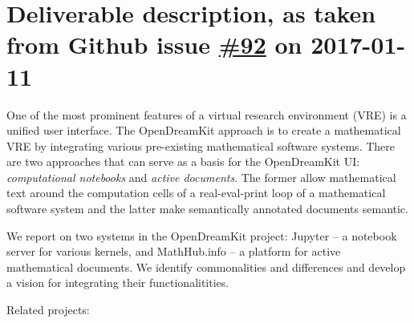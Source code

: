 \section*{\texorpdfstring{Deliverable description, as taken from Github
issue
\href{https://github.com/OpenDreamKit/OpenDreamKit/issues/91}{\#92} on
2017-01-11}{Deliverable description, as taken from Github issue \#92 on 2017-01-11}}\label{deliverable-description-as-taken-from-github-issue-92-on-2017-01-11}


One of the most prominent features of a virtual research environment
(VRE) is a unified user interface. The OpenDreamKit approach is to
create a mathematical VRE by integrating various pre-existing
mathematical software systems. There are two approaches that can serve
as a basis for the OpenDreamKit UI: \emph{computational notebooks} and
\emph{active documents}. The former allow mathematical text around the
computation cells of a real-eval-print loop of a mathematical software
system and the latter make semantically annotated documents semantic.

We report on two systems in the OpenDreamKit project: Jupyter -- a
notebook server for various kernels, and MathHub.info -- a platform for
active mathematical documents. We identify commonalities and differences
and develop a vision for integrating their functionalitities.

Related projects:

